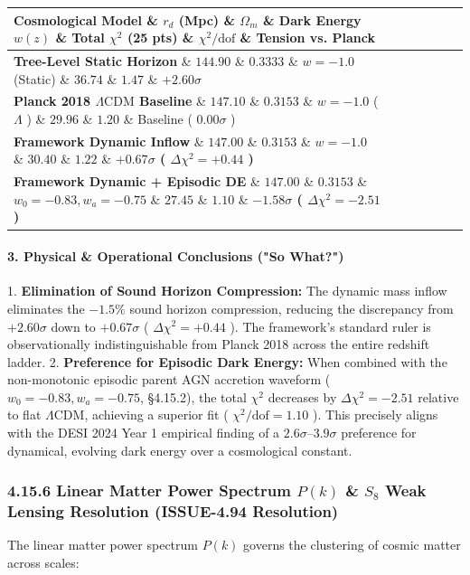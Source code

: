 \documentclass[11pt,a4paper]{article}
\theoremstyle{definition}\newtheorem{definition}{Definition}
\theoremstyle{remark}\newtheorem{remark}{Remark}
\begin{document}
\begin{longtable}{lllllll}
\hline
Cosmological Model \& $r_d$ (Mpc) \& $\Omega_m$ \& Dark Energy $w(z)$ \& Total $\chi^2$ (25 pts) \& $\chi^2 / \text{dof}$ \& Tension vs. Planck \\
\hline
\textbf{Tree-Level Static Horizon} \& $144.90$ \& $0.3333$ \& $w = -1.0$ (Static) \& $36.74$ \& $1.47$ \& $+2.60\sigma$ \\
\textbf{Planck 2018 $\Lambda\text{CDM}$ Baseline} \& $147.10$ \& $0.3153$ \& $w = -1.0$ ( $\Lambda$ ) \& $29.96$ \& $1.20$ \& Baseline ( $0.00\sigma$ ) \\
\textbf{Framework Dynamic Inflow} \& $147.00$ \& $0.3153$ \& $w = -1.0$ \& \textbf{$30.40$} \& \textbf{$1.22$} \& \textbf{$+0.67\sigma$ ( $\Delta\chi^2 = +0.44$ )} \\
\textbf{Framework Dynamic + Episodic DE} \& $147.00$ \& $0.3153$ \& $w_0 = -0.83, w_a = -0.75$ \& \textbf{$27.45$} \& \textbf{$1.10$} \& \textbf{$-1.58\sigma$ ( $\Delta\chi^2 = -2.51$ )} \\
\hline
\end{longtable}\paragraph{3. Physical \& Operational Conclusions ("So What?")}

1. \textbf{Elimination of Sound Horizon Compression:} The dynamic mass inflow eliminates the $-1.5\%$ sound horizon compression, reducing the discrepancy from $+2.60\sigma$ down to $+0.67\sigma$ ( $\Delta\chi^2 = +0.44$ ). The framework's standard ruler is observationally indistinguishable from Planck 2018 across the entire redshift ladder.
2. \textbf{Preference for Episodic Dark Energy:} When combined with the non-monotonic episodic parent AGN accretion waveform ( $w_0 = -0.83, w_a = -0.75$, §4.15.2), the total $\chi^2$ decreases by $\Delta\chi^2 = -2.51$ relative to flat $\Lambda\text{CDM}$, achieving a superior fit ( $\chi^2/\text{dof} = 1.10$ ). This precisely aligns with the DESI 2024 Year 1 empirical finding of a $2.6\sigma\text{--}3.9\sigma$ preference for dynamical, evolving dark energy over a cosmological constant.
\subsubsection{4.15.6 Linear Matter Power Spectrum $P(k)$ \& $S_8$ Weak Lensing Resolution (ISSUE-4.94 Resolution)}

The linear matter power spectrum $P(k)$ governs the clustering of cosmic matter across scales:
\end{document}

